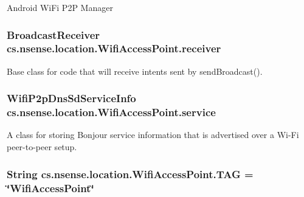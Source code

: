 Android Wi\-Fi P2\-P Manager \hypertarget{classcs_1_1nsense_1_1location_1_1_wifi_access_point_a995e5ccfeb5917c63044060e17f6a751}{
\subsubsection[{receiver}]{\setlength{\rightskip}{0pt plus 5cm}Broadcast\-Receiver cs.\-nsense.\-location.\-Wifi\-Access\-Point.\-receiver\hspace{0.3cm}{\ttfamily [private]}}}\label{classcs_1_1nsense_1_1location_1_1_wifi_access_point_a995e5ccfeb5917c63044060e17f6a751}
Base class for code that will receive intents sent by send\-Broadcast(). \hypertarget{classcs_1_1nsense_1_1location_1_1_wifi_access_point_a45429f28ad9c4e2c36122e8ace3f3250}{
\subsubsection[{service}]{\setlength{\rightskip}{0pt plus 5cm}Wifi\-P2p\-Dns\-Sd\-Service\-Info cs.\-nsense.\-location.\-Wifi\-Access\-Point.\-service\hspace{0.3cm}{\ttfamily [private]}}}\label{classcs_1_1nsense_1_1location_1_1_wifi_access_point_a45429f28ad9c4e2c36122e8ace3f3250}
A class for storing Bonjour service information that is advertised over a Wi-\/\-Fi peer-\/to-\/peer setup. \hypertarget{classcs_1_1nsense_1_1location_1_1_wifi_access_point_affaf896e654a0d447817962205ea2445}{
\subsubsection[{T\-A\-G}]{\setlength{\rightskip}{0pt plus 5cm}String cs.\-nsense.\-location.\-Wifi\-Access\-Point.\-T\-A\-G = \char`\"{}Wifi\-Access\-Point\char`\"{}\hspace{0.3cm}{\ttfamily [private]}}}\label{classcs_1_1nsense_1_1location_1_1_wifi_access_point_affaf896e654a0d447817962205ea2445}
